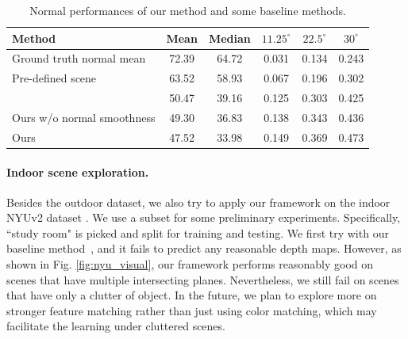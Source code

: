 \begin{table}[t] \small
\centering
\caption{Normal performances of our method and some baseline methods.}
\label{tbl:normal}
\fontsize{6.5}{7}\selectfont
\bgroup
\def\arraystretch{1.2}
\begin{tabular}{l|c|c|c|c|c}
\thickhline
Method                        & Mean  & Median & $11.25^{\circ}$ & $22.5^{\circ}$  & $30^{\circ}$    \\ \hline
Ground truth normal mean      & 72.39 & 64.72  & 0.031 & 0.134 & 0.243 \\
Pre-defined scene             & 63.52 & 58.93  & 0.067 & 0.196 & 0.302 \\
\cite{zhou2017unsupervised} & 50.47 & 39.16  & 0.125 & 0.303 & 0.425 \\
Ours w/o normal smoothness    & 49.30 & 36.83  & 0.138 & 0.343 & 0.436 \\
Ours                          & 47.52 & 33.98  & 0.149 & 0.369 & 0.473 \\ \hline
\end{tabular}
\egroup
\vspace{-1.0\baselineskip}
\end{table}


\vspace{-0.7\baselineskip}
\paragraph{Indoor scene exploration.}
Besides the outdoor dataset, we also try to apply our framework on the indoor NYUv2 dataset \cite{silberman2012indoor}. We use a subset for some preliminary experiments. Specifically, ``study room" is picked and split for training and testing. We first try with our baseline method~\cite{zhou2017unsupervised}, and it fails to predict any reasonable depth maps. However, as shown in Fig. \ref{fig:nyu_visual}, our framework performs reasonably good on scenes that have multiple intersecting planes. Nevertheless, we still fail on scenes that have only a clutter of object. In the future, we plan to explore more on stronger feature matching rather than just using color matching, which may facilitate the learning under cluttered scenes.

